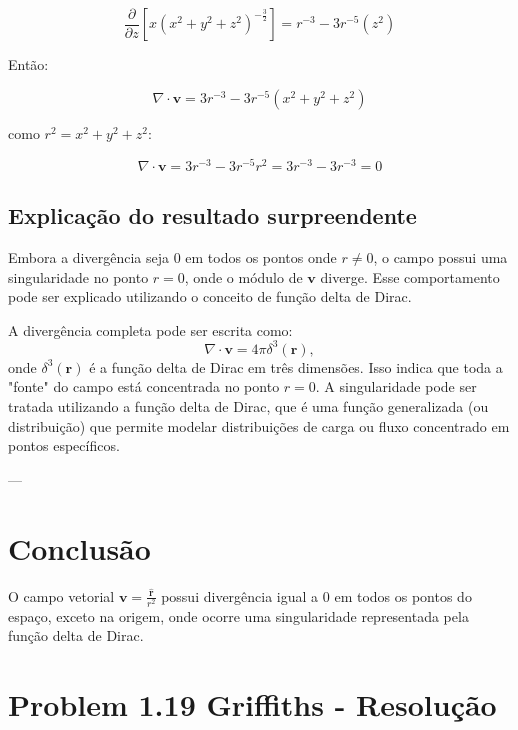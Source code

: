 \documentclass[a4paper,12pt]{article}
\begin{document}
\begin{equation}
    \frac{\partial}{\partial z}\left[x(x^2+y^2+z^2)^{-\frac{3}{2}}\right] = r^{-3} - 3r^{-5}\left(z^2\right)
\end{equation}

Ent\~ao:

\begin{equation}
    \nabla \cdot \mathbf{v} = 3r^{-3} -3r^{-5}\left(x^2+y^2+z^2\right)
\end{equation}

como $r^2 = x^2 + y^2 + z^2$:

\begin{equation}
    \nabla \cdot \mathbf{v} = 3r^{-3} - 3r^{-5}r^2 = 3r^{-3} - 3r^{-3} = 0 
\end{equation}

\subsection*{Explicação do resultado surpreendente}

Embora a divergência seja \( 0 \) em todos os pontos onde \( r \neq 0 \), o campo possui uma singularidade no 
ponto \( r = 0 \), onde o módulo de \( \mathbf{v} \) diverge. Esse comportamento pode ser explicado utilizando 
o conceito de função delta de Dirac. 

A divergência completa pode ser escrita como:
\begin{equation}
\nabla \cdot \mathbf{v} = 4\pi \delta^3(\mathbf{r}),
\end{equation}
onde \( \delta^3(\mathbf{r}) \) é a função delta de Dirac em três dimensões. Isso indica que toda a "fonte" 
do campo está concentrada no ponto \( r = 0 \). A singularidade pode ser tratada utilizando a função delta de Dirac, 
que é uma função generalizada (ou distribuição) que permite modelar distribuições de carga ou fluxo concentrado em 
pontos específicos.

---

\section*{Conclusão}

O campo vetorial \( \mathbf{v} = \frac{\hat{\mathbf{r}}}{r^2} \) possui divergência igual a \( 0 \) em todos os pontos do espaço, 
exceto na origem, onde ocorre uma singularidade representada pela função delta de Dirac.

\newpage
\section*{Problem 1.19 Griffiths - Resolu\c{c}\~ao}
\end{document}
